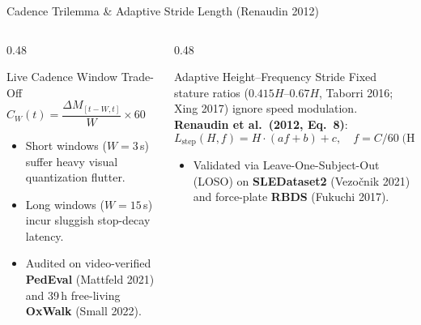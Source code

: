 \documentclass[aspectratio=169,10pt]{beamer}
\begin{document}
\begin{frame}{Cadence Trilemma \& Adaptive Stride Length (Renaudin 2012)}
  \begin{columns}[T]
    \begin{column}{0.48\textwidth}
      \begin{block}{Live Cadence Window Trade-Off}
        \[
          C_W(t) = \frac{\Delta M_{[t-W,t]}}{W} \times 60 \quad (\text{steps/min})
        \]
        \begin{itemize}\small
          \item Short windows ($W=3$\,s) suffer heavy visual quantization flutter.
          \item Long windows ($W=15$\,s) incur sluggish stop-decay latency.
          \item Audited on video-verified \textbf{PedEval} (Mattfeld 2021) and 39\,h free-living \textbf{OxWalk} (Small 2022).
        \end{itemize}
      \end{block}
    \end{column}
    \begin{column}{0.48\textwidth}
      \begin{exampleblock}{Adaptive Height--Frequency Stride}
        \footnotesize Fixed stature ratios ($0.415H$--$0.67H$, Taborri 2016; Xing 2017) ignore speed modulation. \textbf{Renaudin et al.\ (2012, Eq.~8)}:
        \[
          L_{\text{step}}(H, f) = H\cdot(af + b) + c, \quad f = C/60\;\text{(Hz)}
        \]
        \begin{itemize}\small
          \item Validated via Leave-One-Subject-Out (LOSO) on \textbf{SLEDataset2} (Vezo\v{c}nik 2021) and force-plate \textbf{RBDS} (Fukuchi 2017).
        \end{itemize}
      \end{exampleblock}
    \end{column}
  \end{columns}
\end{frame}
\end{document}
